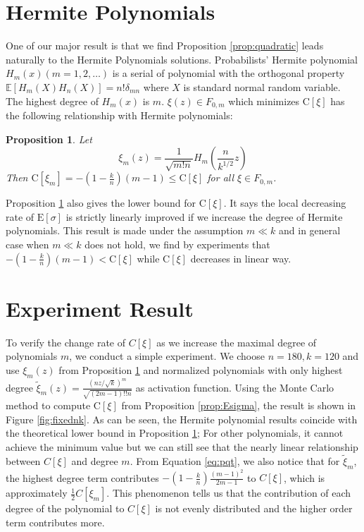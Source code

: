 \documentclass[conference]{IEEEtran}
\newtheorem{proposition}{Proposition}
\def\E{\mathbb{E}}
\begin{document}
\section{Hermite Polynomials}\label{sec:hp}

One of our major result is that we find Proposition \ref{prop:quadratic} leads naturally to the Hermite Polynomials solutions. Probabilists' Hermite polynomial $H_m(x) (m=1,2,\dots)$ is a serial of polynomial with the orthogonal property $ \E[H_m(X)H_n(X)] = n! \delta_{mn}$ where $X$ is standard normal random variable.
The highest degree of $H_m(x)$ is $m$. $\xi(z) \in F_{0, m}$ which minimizes $\mathrm{C}[\xi]$ has the following relationship with Hermite polynomials:
\begin{proposition}\label{prop:value}
Let
\begin{equation}\label{eq:ximopt}
    \xi_m(z) = \frac{1}{\sqrt{m!n}} H_m(\frac{n}{k^{1/2}} z)
\end{equation}
Then $\mathrm{C}[\xi_m] = -(1-\frac{k}{n})(m-1) \leq \mathrm{C}[\xi] $ for all $\xi \in F_{0, m}$.
\end{proposition}
Proposition \ref{prop:value} also gives the lower bound for $\mathrm{C}[\xi]$.
It says the local decreasing rate of $\mathrm{E}[\sigma]$ is strictly linearly improved if we increase the degree of Hermite polynomials. This result is made under the assumption $ m \ll k$ and in general case when $ m \ll k$ does not hold, we find by experiments that $-(1-\frac{k}{n})(m-1) < \mathrm{C}[\xi]$ while $\mathrm{C}[\xi]$ decreases in linear way.

\section{Experiment Result}\label{sec:er}

To verify the change rate of $C[\xi]$ as we increase the maximal degree of polynomials $m$,
we conduct a simple experiment. We choose $n=180, k=120$ and use $\xi_m(z)$ from Proposition
\ref{prop:value} and normalized polynomials with only highest degree $\tilde{\xi}_m(z) = \frac{(nz/\sqrt{k})^m}{\sqrt{(2m-1)!!n}}$ as activation function. Using the Monte Carlo method to compute $\mathrm{C}[\xi]$ from Proposition \ref{prop:Esigma}, the result is shown in Figure \ref{fig:fixednk}. As can be seen, the Hermite polynomial results coincide with the theoretical lower bound in Proposition \ref{prop:value}; For other polynomials, it cannot achieve the minimum value but we can still see that the nearly linear relationship between $C[\xi]$ and degree $m$. From Equation \eqref{eq:pqt}, we also notice that for $\tilde{\xi}_m$, the highest degree term contributes $-(1-\frac{k}{n})\frac{(m-1)^2}{2m-1}$ to $C[\xi]$, which is approximately $\frac{1}{2} C[\xi_m]$. This phenomenon tells us that the contribution of each degree of the polynomial to $C[\xi]$ is not evenly distributed and
the higher order term contributes more.  
\end{document}
